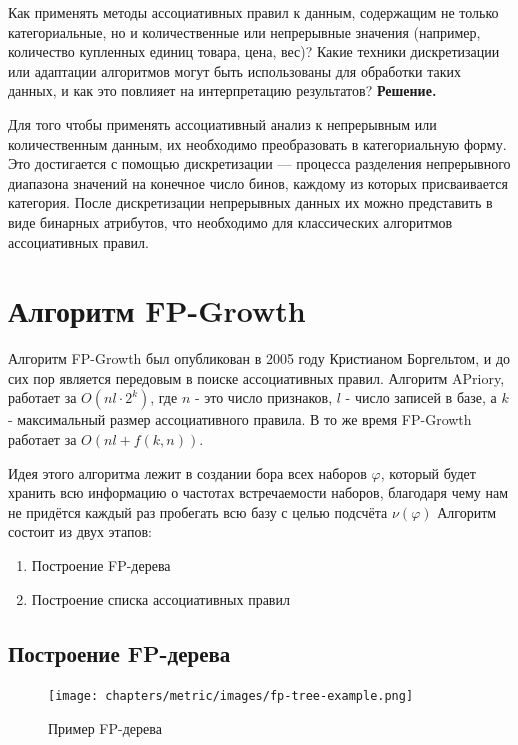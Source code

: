 Как применять методы ассоциативных правил к данным, содержащим не только категориальные, но и количественные или непрерывные значения (например, количество купленных единиц товара, цена, вес)? Какие техники дискретизации или адаптации алгоритмов могут быть использованы для обработки таких данных, и как это повлияет на интерпретацию результатов?
\newline
\textbf{Решение.}

Для того чтобы применять ассоциативный анализ к непрерывным или количественным данным, их необходимо преобразовать в категориальную форму. Это достигается с помощью дискретизации — процесса разделения непрерывного диапазона значений на конечное число бинов, каждому из которых присваивается категория. После дискретизации непрерывных данных их можно представить в виде бинарных атрибутов, что необходимо для классических алгоритмов ассоциативных правил.

\section{Алгоритм FP-Growth}
Алгоритм FP-Growth был опубликован в 2005 году Кристианом Боргельтом, и до сих пор является передовым в поиске ассоциативных правил. Алгоритм APriory, работает за $O(nl\cdot 2^k)$, где $n$ - это число признаков, $l$ - число записей в базе, а $k$ - максимальный размер ассоциативного правила. В то же время FP-Growth работает за $O(nl + f(k, n))$.

Идея этого алгоритма лежит в создании бора всех наборов $\varphi$, который будет хранить всю информацию о частотах встречаемости наборов, благодаря чему нам не придётся каждый раз пробегать всю базу с целью подсчёта $\nu(\varphi)$
\newline\newline
Алгоритм состоит из двух этапов:
\begin{enumerate}
    \item Построение FP-дерева
    \item Построение списка ассоциативных правил
\end{enumerate}

\subsection{Построение FP-дерева}

\begin{figure}[h]
    \centering
    \texttt{[image: chapters/metric/images/fp-tree-example.png]}
    \caption{Пример FP-дерева}
\end{figure}

